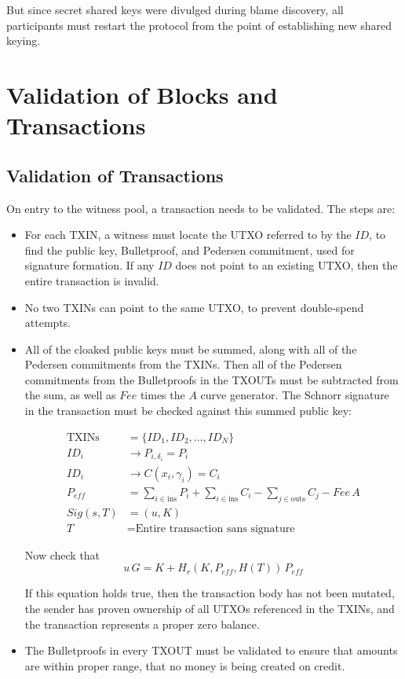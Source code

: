 \documentclass[a4paper, 10pt, conference]{ieeeconf}
\begin{document}
But since secret shared keys were divulged during blame discovery, all participants must restart the protocol from the point of establishing new shared keying.

\section{Validation of Blocks and Transactions}\label{ValidationAppendix}

\subsection{Validation of Transactions}
On entry to the witness pool, a transaction needs to be validated. The steps are:

\begin{itemize}
	\item{For each TXIN, a witness must locate the UTXO referred to by the $ID$, to find the public key, Bulletproof, and Pedersen commitment, used for signature formation. If any $ID$ does not point to an existing UTXO, then the entire transaction is invalid.}
	\item{No two TXINs can point to the same UTXO, to prevent double-spend attempts.}
	\item{All of the cloaked public keys must be summed, along with all of the Pedersen commitments from the TXINs. Then all of the Pedersen commitments from the Bulletproofs in the TXOUTs must be subtracted from the sum, as well as $Fee$ times the $A$ curve generator. The Schnorr signature in the transaction must be checked against this summed public key:

	\begin{align*}
		\text{TXINs} &= \{ID_1, ID_2, ..., ID_N\} \\
		ID_i &\rightarrow P_{i, \delta_i} = P_i\\
		ID_i &\rightarrow C(x_i, \gamma_i) = C_i\\
		P_{eff} &= \sum_{i \in \text{ins}}{P_i} + \sum_{i \in \text{ins}}{C_i}  - \sum_{j \in \text{outs}}{C_j} - Fee\,A\\
		Sig(s, T) &= (u, K)\\
		T &= \text{Entire transaction sans signature}
	\end{align*}

	Now check that
	$$u \, G = K + H_r(K, P_{eff}, H(T)) \, P_{eff}$$
	
	If this equation holds true, then the transaction body has not been mutated, the sender has proven ownership of all UTXOs referenced in the TXINs, and the transaction represents a proper zero balance.}
	\item{The Bulletproofs in every TXOUT must be validated to ensure that amounts are within proper range, that no money is being created on credit.}
\end{itemize}
\end{document}
